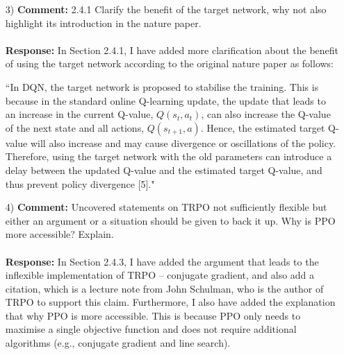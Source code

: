 \documentclass[11pt]{article}
\begin{document}
\begin{enumerate}
\item[3)] \textbf{Comment:} 2.4.1 Clarify the benefit of the target network, why not also highlight its introduction in the nature paper.\\ \\
\textbf{Response:} In Section 2.4.1, I have added more clarification about the benefit of using the target network according to the original nature paper as follows:

``In DQN, the target network is proposed to stabilise the training. This is because in the standard online Q-learning update, the update that leads to an increase in the current Q-value, $Q(s_{t}, a_{t})$, can also increase the Q-value of the next state and all actions, $Q(s_{t+1}, a)$. Hence, the estimated target Q-value will also increase and may cause divergence or oscillations of the policy. Therefore, using the target network with the old parameters can introduce a delay between the updated Q-value and the estimated target Q-value, and thus prevent policy divergence [5]."

\item[4)] \textbf{Comment:} Uncovered statements on TRPO not sufficiently flexible but either an argument or a situation should be given to back it up. Why is PPO more accessible? Explain.
\\ \\
\textbf{Response:} In Section 2.4.3, I have added the argument that leads to the inflexible implementation of TRPO -- conjugate gradient, and also add a citation, which is a lecture note from John Schulman, who is the author of TRPO to support this claim. Furthermore, I also have added the explanation that why PPO is more accessible. This is because PPO only needs to maximise a single objective function and does not require additional algorithms (e.g., conjugate gradient and line search).
\end{enumerate}

\newpage
\end{document}
